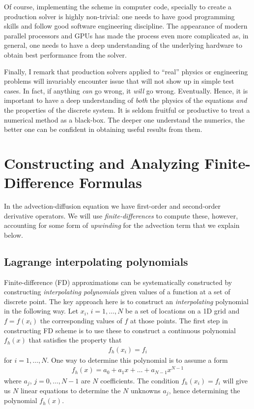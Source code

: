 \documentclass[12pt]{article}
\theoremstyle{definition}
\theoremstyle{definition}
\theoremstyle{definition}
\begin{document}
Of course, implementing the scheme in computer code, specially to
create a production solver is highly non-trivial: one needs to have
good programming skills and follow good software engineering
discipline. The appearance of modern parallel processors and GPUs has
made the process even more complicated as, in general, one needs to
have a deep understanding of the underlying hardware to obtain best
performance from the solver.

Finally, I remark that production solvers applied to ``real'' physics
or engineering problems will invariably encounter issue that will not
show up in simple test cases. In fact, if anything \emph{can} go
wrong, it \emph{will} go wrong. Eventually. Hence, it is important to
have a deep understanding of \emph{both} the physics of the equations
\emph{and} the properties of the discrete system. It is seldom
fruitful or productive to treat a numerical method as a black-box. The
deeper one understand the numerics, the better one can be confident in
obtaining useful results from them.

\section{Constructing and Analyzing Finite-Difference Formulas}

In the advection-diffusion equation we have first-order and
second-order derivative operators. We will use
\emph{finite-differences} to compute these, however, accounting for
some form of \emph{upwinding} for the advection term that we explain
below.

\subsection{Lagrange interpolating polynomials}

Finite-difference (FD) approximations can be systematically
constructed by constructing \emph{interpolating polynomials} given
values of a function at a set of discrete point. The key approach here
is to construct an \emph{interpolating} polynomial in the following
way. Let $x_i$, $i=1,\ldots,N$ be a set of locations on a 1D grid and
$f = f(x_i)$ the corresponding values of $f$ at those points. The
first step in constructing FD scheme is to use these to construct a
continuous polynomial $f_h(x)$ that satisfies the property that
\begin{align}
  f_h(x_i) = f_i
\end{align}
for $i=1,\ldots,N$. One way to determine this polynomial is to assume
a form
\begin{align}
  f_h(x) = a_0 + a_1 x + \ldots + a_{N-1} x^{N-1}
\end{align}
where $a_j$, $j = 0, \ldots, N-1$ are $N$ coefficients. The condition
$f_h(x_i) = f_i$ will give us $N$ linear equations to determine the
$N$ unknowns $a_j$, hence determining the polynomial $f_h(x)$.
\end{document}
